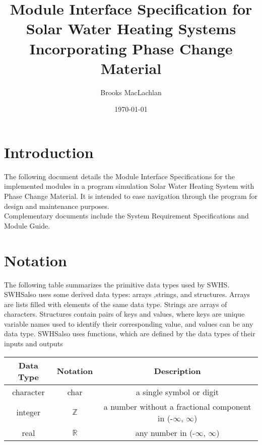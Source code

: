 \documentclass[12pt]{article}
\newcommand{\progname}{SWHS}
\begin{document}
\title{Module Interface Specification for Solar Water Heating Systems Incorporating Phase Change Material}
\author{Brooks MacLachlan}
\date{\today}

\maketitle

\tableofcontents

\section{Introduction}

The following document details the Module Interface Specifications for the implemented 
modules in a program simulation Solar Water Heating System with Phase Change Material.
It is intended to ease navigation through the program for design and maintenance purposes.\\
Complementary documents include the System Requirement Specifications and Module Guide. 

\section{Notation}

The following table summarizes the primitive data types used by \progname. \progname also uses some derived data types: arrays ,strings, and structures. Arrays are lists filled with elements of the same data type. Strings are arrays of characters. Structures contain pairs of keys and values, where keys are unique variable names used to identify their corresponding value, and values can be any data type. \progname also uses functions, which are defined by the data types of their inputs and outputs

\begin{center}
\renewcommand{\arraystretch}{1.2}
\noindent 
\begin{tabular}{c c c} 
\toprule 
\textbf{Data Type} & \textbf{Notation} & \textbf{Description}\\ 
\midrule
character & char & a single symbol or digit\\
integer & $\mathbb{Z}$ & a number without a fractional component in (-$\infty$, $\infty$) \\
real & $\mathbb{R}$ & any number in (-$\infty$, $\infty$)\\
\bottomrule
\end{tabular} 
\end{center}
\end{document}
